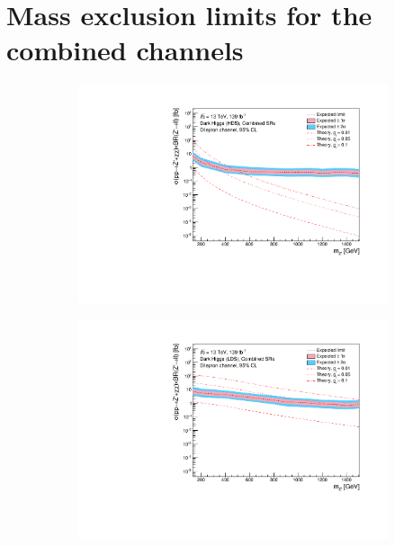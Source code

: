 \documentclass[12pt, a4paper]{book}
\begin{document}
\clearpage
\section{Mass exclusion limits for the combined channels}
\begin{figure}[!ht]
	\centering
	\begin{subfigure}[b]{0.49\textwidth}
      \centering
      \includegraphics[width=1\textwidth]{Limits/Model_independent/DH_HDS/mass_exclusion_comb.pdf}
   \end{subfigure}
   \hfill
   \begin{subfigure}[b]{0.49\textwidth}
      \centering
      \includegraphics[width=1\textwidth]{Limits/Model_independent/DH_LDS/mass_exclusion_comb.pdf}
   \end{subfigure}
   \hfill
   \begin{subfigure}[b]{0.49\textwidth}

\end{subfigure}
\end{figure}
\end{document}
